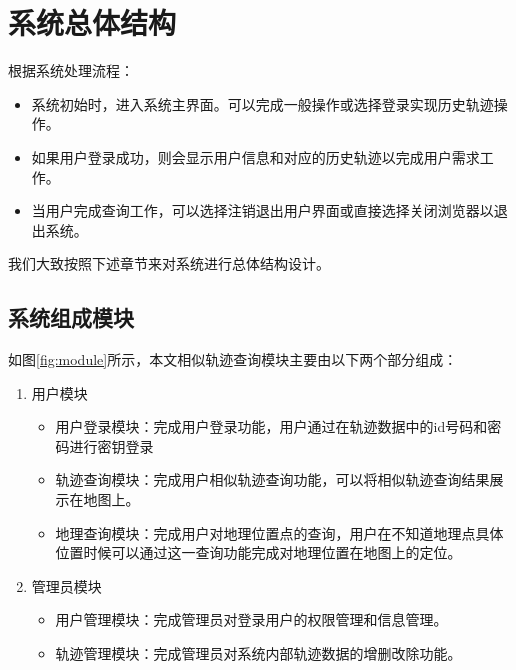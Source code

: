
\section{系统总体结构}
\label{sec:system analysis}
根据系统处理流程：
\begin{itemize}
	\item 系统初始时，进入系统主界面。可以完成一般操作或选择登录实现历史轨迹操作。
	\item 如果用户登录成功，则会显示用户信息和对应的历史轨迹以完成用户需求工作。
	\item 当用户完成查询工作，可以选择注销退出用户界面或直接选择关闭浏览器以退出系统。
\end{itemize}

我们大致按照下述章节来对系统进行总体结构设计。

\subsection{系统组成模块}
\label{subsec:component analysis}
\begin{figure}[!htp]
    \centering
    \resizebox{!}{!}{}
\end{figure}

如图\ref{fig:module}所示，本文相似轨迹查询模块主要由以下两个部分组成：
\begin{enumerate}
	\item 用户模块
	\begin{itemize}
		\item 用户登录模块：完成用户登录功能，用户通过在轨迹数据中的id号码和密码进行密钥登录
		\item 轨迹查询模块：完成用户相似轨迹查询功能，可以将相似轨迹查询结果展示在地图上。
		\item 地理查询模块：完成用户对地理位置点的查询，用户在不知道地理点具体位置时候可以通过这一查询功能完成对地理位置在地图上的定位。
	\end{itemize}
	\item 管理员模块
	\begin{itemize}
		\item 用户管理模块：完成管理员对登录用户的权限管理和信息管理。
		\item 轨迹管理模块：完成管理员对系统内部轨迹数据的增删改除功能。
	\end{itemize}
\end{enumerate}

